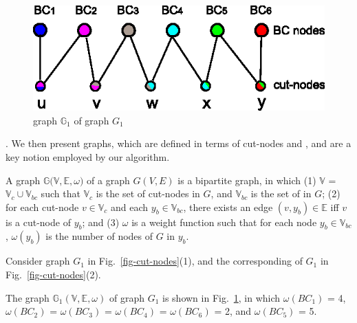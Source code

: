 \begin{figure}[tb!]
\begin{center}
\includegraphics[scale=0.9]{./sketch-graphs.eps}
\end{center}
\vspace{-2ex}
\caption{\bcsketch graph $\mathbb{G}_1$ of graph $G_1$}
\label{fig-sketch-graph}\vspace{-3ex}
\end{figure}

. We then present \bcsketch graphs, which are defined in terms of cut-nodes and \bccs, and are a key notion employed by our algorithm.

A \bcsketch graph $\mathbb{G(V, E}, \omega)$ of a graph $G(V, E)$ is a bipartite graph, in which (1) $\mathbb{V}$ = $\mathbb{V}_{c}\cup \mathbb{V}_{bc}$
such that $\mathbb{V}_{c}$ is the set of cut-nodes in $G$, and $\mathbb{V}_{bc}$ is the set of \bccs in $G$;
(2) for each cut-node $v\in \mathbb{V}_{c}$ and each \bc $y_{b}\in \mathbb{V}_{bc}$, there exists an edge $(v, y_b)\in \mathbb{E}$ iff $v$ is a cut-node of \bc $y_b$;
and (3) $\omega$ is a weight function such that for each node $y_b\in \mathbb{V}_{bc}$, $\omega(y_b)$ is the number of nodes of $G$ in \bc $y_b$.




\vspace{-0.5ex}
\begin{example}
\label{exm-sketch-graph} Consider graph $G_1$ in Fig.~\ref{fig-cut-nodes}(1), and the corresponding \bccs of $G_1$ in Fig.~\ref{fig-cut-nodes}(2).



The \bcsketch graph $\mathbb{G}_1(\mathbb{V, E}, \omega)$ of graph $G_1$ is shown in Fig.~\ref{fig-sketch-graph},
in which $\omega(BC_1)$ = 4, $\omega(BC_2)$ = $\omega(BC_3)$ = $\omega(BC_4)$ = $\omega(BC_6)$ = 2, and $\omega(BC_5)$ = 5.
\end{example}

